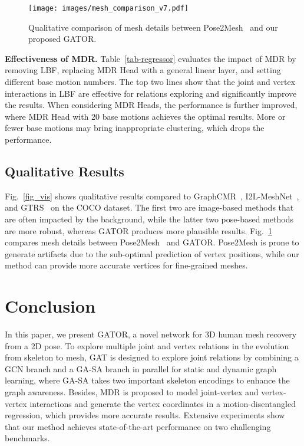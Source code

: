 \documentclass{article}
\def\VspacePa{\vspace{-0.30cm}}
\def\VspacePb{\vspace{-0.20cm}}
\begin{document}
\begin{figure}[!t]
  \vspace{-2mm}
  \texttt{[image: images/mesh\_comparison\_v7.pdf]}
\vspace{-5mm}
  \caption{Qualitative comparison of mesh details between Pose2Mesh~\cite{choi2020pose2mesh} and our proposed GATOR.}
  \label{fig_mesh}
\vspace{-4mm}
\end{figure}

\noindent \textbf{Effectiveness of MDR.}
Table~\ref{tab-regressor} evaluates the impact of MDR by removing LBF, replacing MDR Head with a general linear layer, and setting different base motion numbers. The top two lines show that the joint and vertex interactions in LBF are effective for relations exploring and significantly improve the results. When considering MDR Heads, the performance is further improved, where MDR Head with 20 base motions achieves the optimal results. 
More or fewer base motions may bring inappropriate clustering, which drops the performance.

\VspacePa
\subsection{Qualitative Results}
\VspacePb
Fig.~\ref{fig_vis} shows qualitative results compared to GraphCMR~\cite{kolotouros2019convolutional}, I2L-MeshNet~\cite{moon2020i2l}, and GTRS~\cite{zheng2021lightweight} on the COCO dataset. The first two are image-based methods that are often impacted by the background, while the latter two pose-based methods are more robust, whereas GATOR produces more plausible results.
Fig.~\ref{fig_mesh} compares mesh details between Pose2Mesh~\cite{choi2020pose2mesh} and GATOR. Pose2Mesh is prone to generate artifacts due to the sub-optimal prediction of vertex positions, while our method can provide more accurate vertices for fine-grained meshes.

\vspace{-2mm}
\section{Conclusion}
\vspace{-2mm}
In this paper, we present GATOR, a novel network for 3D human mesh recovery from a 2D pose. To explore multiple joint and vertex relations in the evolution from skeleton to mesh, GAT is designed to explore joint relations by combining a GCN branch and a GA-SA branch in parallel for static and dynamic graph learning, where GA-SA takes two important skeleton encodings to enhance the graph awareness. Besides, MDR is proposed to model joint-vertex and vertex-vertex interactions and generate the vertex coordinates in a motion-disentangled regression, 
which provides more accurate results.
Extensive experiments show that our method achieves state-of-the-art performance on two challenging benchmarks.

\vfill\pagebreak

{\small



}
\end{document}
